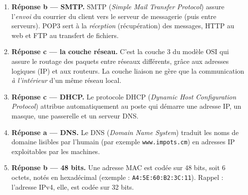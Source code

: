 \documentclass[11pt]{article}
\newcommand{\cle}[1]{{\popxbold\color{popdark}#1}}
\begin{document}
\begin{corrige}
\begin{enumerate}
\item \textbf{Réponse b — \cle{SMTP}.} \cle{SMTP} (\emph{Simple Mail Transfer Protocol}) assure l'\emph{envoi} du courrier du client vers le serveur de messagerie (puis entre serveurs). \cle{POP3} sert à la \emph{réception} (récupération) des messages, \cle{HTTP} au web et \cle{FTP} au transfert de fichiers.
\item \textbf{Réponse c — la couche réseau.} C'est la couche 3 du modèle \cle{OSI} qui assure le routage des paquets entre réseaux différents, grâce aux adresses logiques (IP) et aux routeurs. La couche liaison ne gère que la communication \emph{à l'intérieur} d'un même réseau local.
\item \textbf{Réponse c — \cle{DHCP}.} Le protocole \cle{DHCP} (\emph{Dynamic Host Configuration Protocol}) attribue automatiquement au poste qui démarre une adresse IP, un masque, une passerelle et un serveur DNS.
\item \textbf{Réponse a — \cle{DNS}.} Le \cle{DNS} (\emph{Domain Name System}) traduit les noms de domaine lisibles par l'humain (par exemple \texttt{www.impots.cm}) en adresses IP exploitables par les machines.
\item \textbf{Réponse b — 48 bits.} Une adresse \cle{MAC} est codée sur 48 bits, soit 6 octets, notés en hexadécimal (exemple : \texttt{A4:5E:60:B2:3C:11}). Rappel : l'adresse \cle{IPv4}, elle, est codée sur 32 bits.
\end{enumerate}
\end{corrige}
\end{document}
